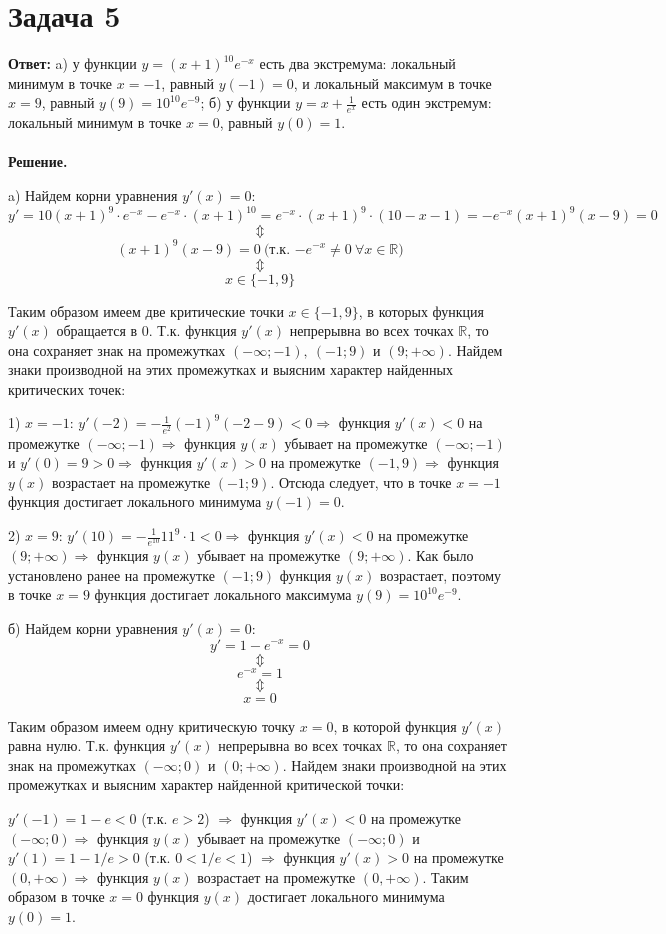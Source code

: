 \documentclass{article}
\begin{document}
\section*{Задача 5}
{\bf Ответ:} a) у функции $y=(x+1)^{10}e^{-x}$ есть два экстремума: локальный минимум в точке $x=-1$, равный $y(-1)=0$, и локальный максимум в точке $x=9$, равный $y(9)=10^{10}e^{-9}$; б) у функции $y=x+\frac{1}{e^x}$ есть один экстремум: локальный минимум в точке $x=0$, равный $y(0)=1$.
\\
\\
{\bf Решение.}
\par
a) Найдем корни уравнения $y'(x)=0$:
$$y'=10(x+1)^9\cdot e^{-x}-e^{-x}\cdot(x+1)^{10}=e^{-x}\cdot(x+1)^9\cdot(10-x-1)=-e^{-x}(x+1)^9(x-9)=0$$
$$\Updownarrow$$
$$(x+1)^9(x-9)=0\ \textrm{(т.к. $-e^{-x} \neq 0\ \forall x \in \mathbb{R}$)} $$
$$\Updownarrow$$
$$x\in\{-1,9\}$$
\par
Таким образом имеем две критические точки $x\in\{-1,9\}$, в которых функция $y'(x)$ обращается в 0. Т.к. функция $y'(x)$ непрерывна во всех точках $\mathbb{R}$, то она сохраняет знак на промежутках $(-\infty;-1),\ (-1;9)$ и $(9;+\infty)$. Найдем знаки производной на этих промежутках и выясним характер найденных критических точек:
\par
1) $x=-1$: $y'(-2)=-\frac{1}{e^2}(-1)^9(-2-9) < 0 \Rightarrow$  функция $y'(x) < 0$ на промежутке $(-\infty;-1)\Rightarrow$ функция $y(x)$ убывает на промежутке $(-\infty; -1)$ и $y'(0)=9 > 0\Rightarrow$ функция $y'(x) > 0$ на промежутке $(-1, 9)\Rightarrow$  функция $y(x)$ возрастает на промежутке $(-1;9)$. Отсюда следует, что в точке $x=-1$ функция достигает локального минимума $y(-1)=0$.
\par
2) $x=9$: $y'(10)=-\frac{1}{e^{10}}11^9\cdot 1 < 0\Rightarrow$   функция $y'(x) < 0$ на промежутке $(9;+\infty)\Rightarrow$ функция $y(x)$ убывает на промежутке $(9;+\infty)$. Как было установлено ранее на промежутке $(-1; 9)$ функция $y(x)$ возрастает, поэтому в точке $x=9$ функция достигает локального максимума $y(9)=10^{10}e^{-9}$.
\par
б) Найдем корни уравнения $y'(x)=0$:
$$y' = 1-e^{-x}=0$$
$$\Updownarrow$$
$$e^{-x}=1$$
$$\Updownarrow$$
$$x=0$$
\par
Таким образом имеем одну критическую точку $x=0$, в которой функция $y'(x)$ равна нулю. Т.к. функция $y'(x)$ непрерывна во всех точках $\mathbb{R}$, то она сохраняет знак на промежутках $(-\infty;0)$ и $(0;+\infty)$. Найдем знаки производной на этих промежутках и выясним характер найденной критической точки:
\par
$y'(-1)=1-e < 0$ (т.к. $e > 2$) $\Rightarrow$ функция $y'(x) < 0$ на промежутке $(-\infty;0)\Rightarrow$ функция $y(x)$ убывает на промежутке $(-\infty; 0)$ и $y'(1)=1-1/e > 0$ (т.к. $0 < 1/e < 1$) $\Rightarrow$ функция $y'(x) > 0$ на промежутке $(0,+\infty)\Rightarrow$ функция $y(x)$ возрастает на промежутке $(0,+\infty)$. Таким образом в точке $x=0$ функция $y(x)$ достигает локального минимума $y(0)=1$.
\end{document}
